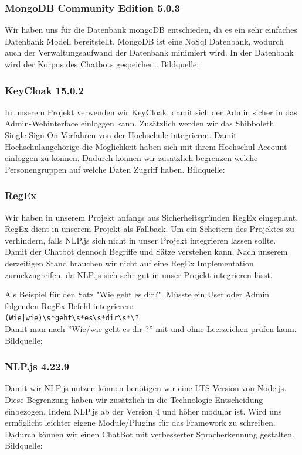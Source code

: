\subsubsection{MongoDB Community Edition 5.0.3}
Wir haben uns für die Datenbank mongoDB entschieden, da es ein sehr einfaches Datenbank Modell bereitstellt.
MongoDB ist eine NoSql Datenbank, wodurch auch der Verwaltungsaufwand der Datenbank minimiert wird.
In der Datenbank wird der Korpus des Chatbots gespeichert.
Bildquelle:\cite{mongodbicon}

\subsubsection{KeyCloak 15.0.2}
In unserem Projekt verwenden wir KeyCloak, damit sich der Admin sicher in das Admin-Webinterface einloggen kann.
Zusätzlich werden wir das Shibboleth Single-Sign-On Verfahren von der Hochschule integrieren.
Damit Hochschulangehörige die Möglichkeit haben sich mit ihrem Hochschul-Account einloggen zu können.
Dadurch können wir zusätzlich begrenzen welche Personengruppen auf welche Daten Zugriff haben.
Bildquelle:\cite{keycloakicon}

\newpage
\subsubsection{RegEx}
Wir haben in unserem Projekt anfangs aus Sicherheitsgründen RegEx eingeplant.
RegEx dient in unserem Projekt als Fallback.
Um ein Scheitern des Projektes zu verhindern, falls NLP.js sich nicht in unser Projekt integrieren lassen sollte.
Damit der Chatbot dennoch Begriffe und Sätze verstehen kann.
Nach unserem derzeitigen Stand brauchen wir nicht auf eine RegEx Implementation zurückzugreifen,
da NLP.js sich sehr gut in unser Projekt integrieren lässt. 

\noindent \newline Als Beispiel für den Satz "Wie geht es dir?".
Müsste ein User oder Admin folgenden RegEx Befehl integrieren:\\
\newline \verb/(Wie|wie)\s*geht\s*es\s*dir\s*\?/ \\
\newline Damit man nach ''Wie/wie geht es dir ?'' mit und ohne Leerzeichen prüfen kann.\\
Bildquelle:\cite{regexicon}

\subsubsection{NLP.js 4.22.9}
Damit wir NLP.js nutzen können benötigen wir eine LTS Version von Node.js.
Diese Begrenzung haben wir zusätzlich in die Technologie Entscheidung einbezogen.
Indem NLP.js ab der Version 4 und höher modular ist. Wird uns ermöglicht leichter eigene Module/Plugins
für das Framework zu schreiben.
Dadurch können wir einen ChatBot mit verbesserter Spracherkennung gestalten.
Bildquelle:\cite{nlpicon}